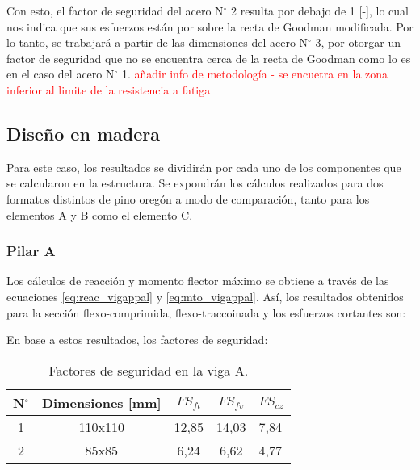 Con esto, el factor de seguridad del acero N$^{\circ}$ 2 resulta por debajo de 1 [-], lo cual nos indica que sus esfuerzos están por sobre la recta de Goodman modificada. Por lo tanto, se trabajará a partir de las dimensiones del acero N$^{\circ}$ 3, por otorgar un factor de seguridad que no se encuentra cerca de la recta de Goodman como lo es en el caso del acero N$^{\circ}$ 1. 
\textcolor{red}{añadir info de metodología - se encuetra en la zona inferior al limite de la resistencia a fatiga}

\subsection{Diseño en madera}
Para este caso, los resultados se dividirán por cada uno de los componentes que se calcularon en la estructura. Se expondrán los cálculos realizados para dos formatos distintos de pino oregón a modo de comparación, tanto para los elementos A y B como el elemento C.

\subsubsection{Pilar A} Los cálculos de reacción y momento flector máximo se obtiene a través de las ecuaciones \ref{eq:reac_vigappal} y \ref{eq:mto_vigappal}. Así, los resultados obtenidos para la sección flexo-comprimida, flexo-traccoinada y los esfuerzos cortantes son:
\begin{table}[h]
\centering
{}
\caption{Resultados obtenidos para la flexión y cizalle de la viga A.}
\label{tab:res_viga_a1}
\end{table}

En base a estos resultados, los factores de seguridad:

\begin{table}[h]
\centering
\begin{tabular}{@{}ccccl@{}}
\toprule
N$^{\circ}$ & Dimensiones [mm] & $FS_{ft}$ & $FS_{fv}$ & $FS_{cz}$ \\ \midrule
1 & 110x110 & 12,85 & 14,03 & 7,84 \\
2 & 85x85 & 6,24 & 6,62 & 4,77 \\ \bottomrule
\end{tabular}
\caption{Factores de seguridad en la viga A.}
\label{tab:res_viga_a2}
\end{table}

